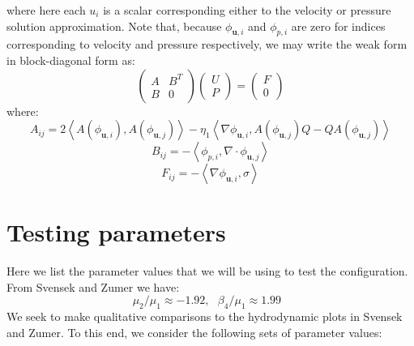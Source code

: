 \documentclass[reqno]{article}
\begin{document}
where here each $u_i$ is a scalar corresponding either to the velocity or
pressure solution approximation.
Note that, because $\phi_{\mathbf{u}, i}$ and $\phi_{p, i}$ are zero for indices
corresponding to velocity and pressure respectively, we may write the weak form
in block-diagonal form as:
\begin{equation}
  \begin{pmatrix}
    A & B^T \\
    B & 0
  \end{pmatrix}
  \begin{pmatrix}
    U \\
    P
  \end{pmatrix}
  =
  \begin{pmatrix}
    F \\
    0
  \end{pmatrix}
\end{equation}
where:
\begin{equation}
  A_{ij}
  =
  2 \left< A(\phi_{\mathbf{u}, i}), A(\phi_{\mathbf{u}, j}) \right>
  - \eta_1 \left< \nabla \phi_{\mathbf{u}, i}, A(\phi_{\mathbf{u}, j}) Q - Q A(\phi_{\mathbf{u}, j}) \right>
\end{equation}
\begin{equation}
  B_{ij}
  =
  - \left< \phi_{p, i}, \nabla \cdot \phi_{\mathbf{u}, j} \right>
\end{equation}
\begin{equation}
  F_{ij}
  =
  - \left< \nabla \phi_{\mathbf{u}, i}, \sigma \right>
\end{equation}

\section{Testing parameters}
Here we list the parameter values that we will be using to test the
configuration.
From Svensek and Zumer we have:
\begin{equation}
  \mu_2 / \mu_1 \approx -1.92, \:\:\:
  \beta_4 / \mu_1 \approx 1.99 \:\:\:
\end{equation}
We seek to make qualitative comparisons to the hydrodynamic plots in Svensek and
Zumer.
To this end, we consider the following sets of parameter values:
\end{document}
